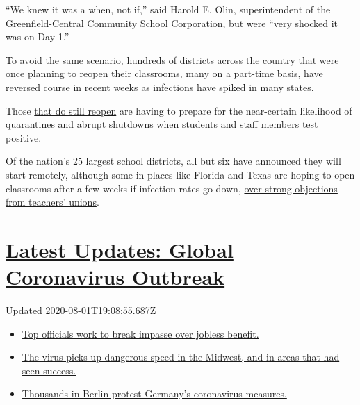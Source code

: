``We knew it was a when, not if,'' said Harold E. Olin, superintendent
of the Greenfield-Central Community School Corporation, but were ``very
shocked it was on Day 1.''

To avoid the same scenario, hundreds of districts across the country
that were once planning to reopen their classrooms, many on a part-time
basis, have
\href{https://www.nytimes3xbfgragh.onion/2020/07/13/us/lausd-san-diego-school-reopening.html}{reversed
course} in recent weeks as infections have spiked in many states.

Those
\href{https://www.nytimes3xbfgragh.onion/2020/07/14/us/coronavirus-schools-fall.html}{that
do still reopen} are having to prepare for the near-certain likelihood
of quarantines and abrupt shutdowns when students and staff members test
positive.

Of the nation's 25 largest school districts, all but six have announced
they will start remotely, although some in places like Florida and Texas
are hoping to open classrooms after a few weeks if infection rates go
down,
\href{https://www.nytimes3xbfgragh.onion/2020/07/29/us/teacher-union-school-reopening-coronavirus.html}{over
strong objections from teachers' unions}.

\hypertarget{latest-updates-global-coronavirus-outbreak}{%
\section{\texorpdfstring{\href{https://www.nytimes3xbfgragh.onion/2020/08/01/world/coronavirus-covid-19.html?action=click\&pgtype=Article\&state=default\&region=MAIN_CONTENT_1\&context=storylines_live_updates}{Latest
Updates: Global Coronavirus
Outbreak}}{Latest Updates: Global Coronavirus Outbreak}}\label{latest-updates-global-coronavirus-outbreak}}

Updated 2020-08-01T19:08:55.687Z

\begin{itemize}
\tightlist
\item
  \href{https://www.nytimes3xbfgragh.onion/2020/08/01/world/coronavirus-covid-19.html?action=click\&pgtype=Article\&state=default\&region=MAIN_CONTENT_1\&context=storylines_live_updates\#link-3ac56579}{Top
  officials work to break impasse over jobless benefit.}
\item
  \href{https://www.nytimes3xbfgragh.onion/2020/08/01/world/coronavirus-covid-19.html?action=click\&pgtype=Article\&state=default\&region=MAIN_CONTENT_1\&context=storylines_live_updates\#link-8796723}{The
  virus picks up dangerous speed in the Midwest, and in areas that had
  seen success.}
\item
  \href{https://www.nytimes3xbfgragh.onion/2020/08/01/world/coronavirus-covid-19.html?action=click\&pgtype=Article\&state=default\&region=MAIN_CONTENT_1\&context=storylines_live_updates\#link-25930521}{Thousands
  in Berlin protest Germany's coronavirus measures.}
\end{itemize}

